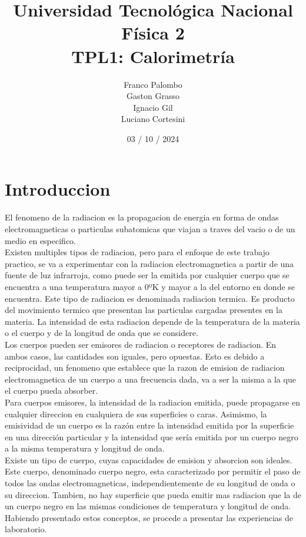 \documentclass[12pt]{report}
\title{%
  \fontsize{25}{0}\selectfont Universidad Tecnológica Nacional \\
  \fontsize{22}{30}\selectfont Física 2 \\
  \fontsize{18}{25}\selectfont TPL1: Calorimetría
}
\author{
Franco Palombo\\
Gaston Grasso\\
Ignacio Gil\\
Luciano Cortesini\\
}
\date{03 / 10 / 2024}
\begin{document}
\chapter{Introduccion}
  El fenomeno de la radiacion es la propagacion de energia en forma de ondas electromagneticas o particulas subatomicas
  que viajan a traves del vacio o de un medio en especifico.\\

  Existen multiples tipos de radiacion, pero para el enfoque de este trabajo practico, se va a experimentar con la
  radiacion electromagnetica a partir de una fuente de luz infrarroja, como puede ser la emitida por cualquier cuerpo
  que se encuentra a una temperatura mayor a 0ºK y mayor a la del entorno en donde se encuentra. Este tipo de radiacion
  es denominada radiacion termica. Es producto del movimiento termico que presentan las particulas cargadas presentes
  en la materia. La intensidad de esta radiacion depende de la temperatura de la materia o el cuerpo y de la longitud
  de onda que se considere.\\

  Los cuerpos pueden ser emisores de radiacion o receptores de radiacion. En ambos casos, las cantidades son iguales,
  pero opuestas. Esto es debido a reciprocidad, un fenomeno que establece que la razon de emision de radiacion
  electromagnetica de un cuerpo a una frecuencia dada, va a ser la misma a la que el cuerpo pueda absorber.\\

  Para cuerpos emisores, la intensidad de la radiacion emitida, puede propagarse en cualquier direccion en cualquiera
  de sus superficies o caras. Asimismo, la emisividad de un cuerpo es la razón entre la intensidad emitida por la
  superficie en una dirección particular y la intensidad que sería emitida por un cuerpo negro a la misma temperatura y
  longitud de onda.\\

  Existe un tipo de cuerpo, cuyas capacidades de emision y absorcion son ideales. Este cuerpo, denominado cuerpo negro,
  esta caracterizado por permitir el paso de todos las ondas electromagneticas, independientemente de su longitud de
  onda o su direccion. Tambien, no hay superficie que pueda emitir mas radiacion que la de un cuerpo negro en las
  mismas condiciones de temperatura y longitud de onda.\\

  Habiendo presentado estos conceptos, se procede a presentar las experiencias de laboratorio.
\end{document}
